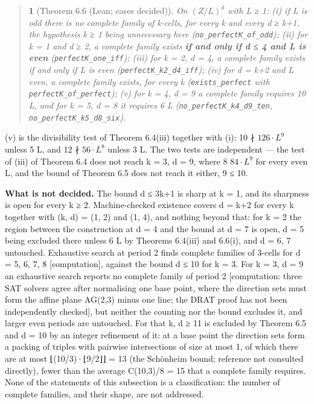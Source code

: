 \documentclass[11pt,a4paper]{article}
\theoremstyle{named}
\newtheorem*{namedthm}{}
\begin{document}
\begin{quote}
\begin{namedthm}[Theorem 6.6 (Lean; cases decided)]
On $(Z/L)^d$ with L ≥ 1: (i) if L is odd there is no complete family of k-cells, for every k and every d ≥ k+1, the hypothesis k ≥ 1 being unnecessary here (\texttt{no\_\allowbreak{}perfectK\_\allowbreak{}of\_\allowbreak{}odd}); (ii) for k = 1 and d ≥ 2, a complete family exists \textbf{if and only if d ≤ 4 and L is even} (\texttt{perfectK\_\allowbreak{}one\_\allowbreak{}iff}); (iii) for k = 2, d = 4, a complete family exists if and only if L is even (\texttt{perfectK\_\allowbreak{}k2\_\allowbreak{}d4\_\allowbreak{}iff}); (iv) for d = k+2 and L even, a complete family exists, for every k (\texttt{exists\_\allowbreak{}perfect} with \texttt{perfectK\_\allowbreak{}of\_\allowbreak{}perfect}); (v) for k = 4, d = 9 a complete family requires 10 \textbar{} L, and for k = 5, d = 8 it requires 6 \textbar{} L (\texttt{no\_\allowbreak{}perfectK\_\allowbreak{}k4\_\allowbreak{}d9\_\allowbreak{}ten}, \texttt{no\_\allowbreak{}perfectK\_\allowbreak{}k5\_\allowbreak{}d8\_\allowbreak{}six}).
\end{namedthm}
\end{quote}
(v) is the divisibility test of Theorem 6.4(iii) together with (i): 10 ∤ $126·L^9$ unless 5 \textbar{} L, and 12 ∤ $56·L^8$ unless 3 \textbar{} L. The two tests are independent — the test of (iii) of Theorem 6.4 does not reach k = 3, d = 9, where 8 \textbar{} $84·L^9$ for every even L, and the bound of Theorem 6.5 does not reach it either, 9 ≤ 10.

\textbf{What is not decided.} The bound d ≤ 3k+1 is sharp at k = 1, and its sharpness is open for every k ≥ 2. Machine-checked existence covers d = k+2 for every k together with (k, d) = (1, 2) and (1, 4), and nothing beyond that: for k = 2 the region between the construction at d = 4 and the bound at d = 7 is open, d = 5 being excluded there unless 6 \textbar{} L by Theorems 6.4(iii) and 6.6(i), and d = 6, 7 untouched. Exhaustive search at period 2 finds complete families of 3-cells for d = 5, 6, 7, 8 [computation], against the bound d ≤ 10 for k = 3. For k = 3, d = 9 an exhaustive search reports no complete family of period 2 [computation: three SAT solvers agree after normalising one base point, where the direction sets must form the affine plane AG(2,3) minus one line; the DRAT proof has not been independently checked], but neither the counting nor the bound excludes it, and larger even periods are untouched. For that k, d ≥ 11 is excluded by Theorem 6.5 and d = 10 by an integer refinement of it: at a base point the direction sets form a packing of triples with pairwise intersections of size at most 1, of which there are at most ⌊(10/3)·⌊9/2⌋⌋ = 13 (the Schönheim bound; reference not consulted directly), fewer than the average C(10,3)/8 = 15 that a complete family requires. None of the statements of this subsection is a classification: the number of complete families, and their shape, are not addressed.
\end{document}
